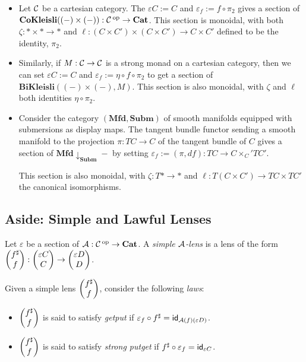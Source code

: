 \begin{itemize}
\item Let $\operatorname{\mathcal{C}}$ be a cartesian category. The $\varepsilon C := C$ and $\varepsilon_f
  := f \circ \pi_2$ gives a section of $\textbf{CoKleisli}((-) \times (-)) :
  \operatorname{\mathcal{C}}\operatorname{^\text{op}} \to \operatorname{\textbf{Cat}}$. This section is monoidal, with both $\zeta : \ast \times \ast \to
  \ast$ and $\ell : (C \times C') \times (C \times C') \to
  C \times C'$ defined to be the identity, $\pi_2$.
\item Similarly, if $M : \operatorname{\mathcal{C}} \to \operatorname{\mathcal{C}}$ is a strong monad on a cartesian category,
  then we can set $\varepsilon C := C$ and $\varepsilon_f := \eta \circ f \circ
  \pi_2$ to get a section of $\textbf{BiKleisli}((-) \times (-), M)$. This
  section is also monoidal, with $\zeta$ and $\ell$ both identities $\eta \circ \pi_2$. 
\item Consider the category $(\textbf{Mfd}, \textbf{Subm})$ of smooth manifolds
  equipped with submersions as display maps. The tangent bundle functor sending
  a smooth manifold to the projection $\pi : TC \to C$ of the tangent bundle of
  $C$ gives a section of $\textbf{Mfd} \downarrow_{\textbf{Subm}} -$ by setting
  $\varepsilon_f := (\pi, df) : TC \to C \times_C' TC'$. 

  This section is also monoidal, with $\zeta : T\ast \to \ast$ and $\ell : T(C \times C') \to TC \times TC'$
  the canonical isomorphisms.
\end{itemize}

\subsection{Aside: Simple and Lawful Lenses}

\begin{defn}
Let $\varepsilon$ be a section of $\operatorname{\mathcal{A}} : \operatorname{\mathcal{C}}\operatorname{^\text{op}} \to \textbf{Cat}$. A \emph{simple
  $\operatorname{\mathcal{A}}$-lens} is a lens of the form
$\begin{pmatrix}{f^{\sharp}} \\ {f} \end{pmatrix} : \begin{pmatrix}{\varepsilon C} \\ {C} \end{pmatrix} \to \begin{pmatrix}{\varepsilon D} \\ {D} \end{pmatrix}$.

Given a simple lens $\begin{pmatrix}{f^{\sharp}} \\ {f} \end{pmatrix}$, consider the following \emph{laws}:
\begin{itemize}
  \item $\begin{pmatrix}{f^{\sharp}} \\ {f} \end{pmatrix}$ is said to satisfy \emph{getput} if $\varepsilon_f
    \circ f^{\sharp} = \operatorname{\mathsf{id}}_{\operatorname{\mathcal{A}}(f)(\varepsilon D)}$.
  \item $\begin{pmatrix}{f^{\sharp}} \\ {f} \end{pmatrix}$ is said to satisfy \emph{strong putget} if
    $f^{\sharp} \circ \varepsilon_f = \operatorname{\mathsf{id}}_{\varepsilon C}$.
\end{itemize}
\end{defn}

